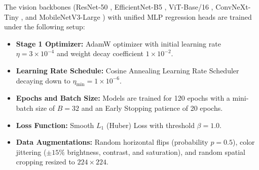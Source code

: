 \documentclass[a4paper,fleqn]{cas-sc}
\begin{document}
The vision backbones (ResNet-50 \cite{resnet}, EfficientNet-B5 \cite{efficientnet}, ViT-Base/16 \cite{vit}, ConvNeXt-Tiny \cite{convnext}, and MobileNetV3-Large \cite{mobilenet}) with unified MLP regression heads are trained under the following setup:
\begin{itemize}
    \item \textbf{Stage 1 Optimizer:} AdamW optimizer with initial learning rate $\eta = 3 \times 10^{-4}$ and weight decay coefficient $1 \times 10^{-2}$.
    \item \textbf{Learning Rate Schedule:} Cosine Annealing Learning Rate Scheduler decaying down to $\eta_{\min} = 1 \times 10^{-6}$.
    \item \textbf{Epochs and Batch Size:} Models are trained for 120 epochs with a mini-batch size of $B = 32$ and an Early Stopping patience of 20 epochs.
    \item \textbf{Loss Function:} Smooth $L_1$ (Huber) Loss \cite{huber} with threshold $\beta = 1.0$.
    \item \textbf{Data Augmentations:} Random horizontal flips (probability $p=0.5$), color jittering ($\pm 15\%$ brightness, contrast, and saturation), and random spatial cropping resized to $224 \times 224$.
\end{itemize}
\end{document}
